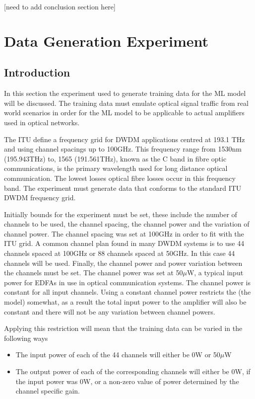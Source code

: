[need to add conclusion section here]




\newpage
\section{Data Generation Experiment}
\label{tw:data_gen}

\subsection{Introduction}

In this section  the experiment used to generate training data for the ML model will be discussed. The training data must emulate optical signal traffic from real world scenarios in order for the ML model to be applicable to actual amplifiers used in optical networks.

The ITU define a frequency grid for DWDM applications centred at 193.1 THz and using channel spacings up to 100GHz. This frequency range from 1530nm (195.943THz) to, 1565 (191.561THz), known as the C band in fibre optic communications, is the primary wavelength used for long distance optical communication. The lowest losses optical fibre losses occur in this frequency band. The experiment must generate data that conforms to the standard ITU DWDM frequency grid. 

Initially bounds for the experiment must be set, these include the number of channels to be used, the channel spacing, the channel power and the variation of channel power.
The channel spacing was set at 100GHz in order to fit with the ITU grid. A common channel plan found in many DWDM systems is to use 44 channels spaced at 100GHz or 88 channels spaced at 50GHz. In this case 44 channels will be used.  Finally, the channel power and power variation between the channels must be set. The channel power was set at 50$\mu$W, a typical input power for EDFAs in use in optical communication systems. The channel power is constant for all input channels. Using a constant channel power restricts the (the model) somewhat, as a result the total input power to the amplifier will also be constant and there will not be any variation between channel powers. 

Applying this restriction will mean that the training data can be varied in the following ways

\begin{itemize}
    \item The input power of each of the 44 channels will either be 0W or 50$\mu$W\\
    
    \item The output power of each of the corresponding channels will either be 0W, if the input power was 0W, or a non-zero value of power determined by the channel specific gain.\\
\end{itemize}


